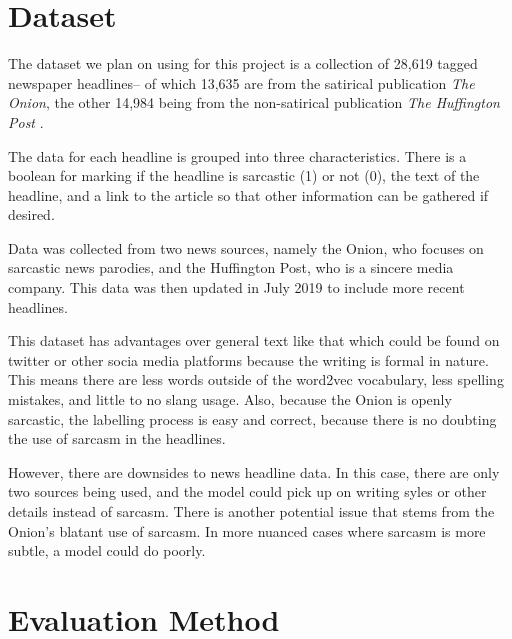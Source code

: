 \documentclass[11pt]{article}
\begin{document}


\section{Dataset}

The dataset we plan on using for this project is a collection of 28,619
tagged newspaper headlines-- of which 13,635 are from the satirical publication
\textit{The Onion}, the other 14,984 being from the non-satirical publication
\textit{The Huffington Post} \cite{misra2023Sarcasm}.

The data for each headline is grouped into three characteristics. There is a boolean
for marking if the headline is sarcastic (1) or not (0), the text of the headline, and
a link to the article so that other information can be gathered if desired.

Data was collected from two news sources, namely the Onion, who focuses on sarcastic
news parodies, and the Huffington Post, who is a sincere media company. This data was
then updated in July 2019 to include more recent headlines.


This dataset has advantages over general text like that which could be found on twitter
or other socia media platforms because the writing is formal in nature. This means there
are less words outside of the word2vec vocabulary, less spelling mistakes, and little to
no slang usage. Also, because the Onion is openly sarcastic, the labelling process is easy 
and correct, because there is no doubting the use of sarcasm in the headlines.

However, there are downsides to news headline data. In this case, there are only two sources
being used, and the model could pick up on writing syles or other details instead of sarcasm.
There is another potential issue that stems from the Onion's blatant use of sarcasm. In more
nuanced cases where sarcasm is more subtle, a model could do poorly.


\section{Evaluation Method}
\end{document}
